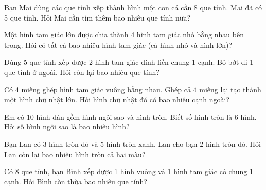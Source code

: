 \begin{ex}
Bạn Mai dùng các que tính xếp thành hình một con cá cần 8 que tính. Mai đã có 5 que tính. Hỏi Mai cần tìm thêm bao nhiêu que tính nữa?
\end{ex}

\begin{ex}
Một hình tam giác lớn được chia thành 4 hình tam giác nhỏ bằng nhau bên trong. Hỏi có tất cả bao nhiêu hình tam giác (cả hình nhỏ và hình lớn)?
\end{ex}

\begin{ex}
Dùng 5 que tính xếp được 2 hình tam giác dính liền chung 1 cạnh. Bỏ bớt đi 1 que tính ở ngoài. Hỏi còn lại bao nhiêu que tính?
\end{ex}

\begin{ex}
Có 4 miếng ghép hình tam giác vuông bằng nhau. Ghép cả 4 miếng lại tạo thành một hình chữ nhật lớn. Hỏi hình chữ nhật đó có bao nhiêu cạnh ngoài?
\end{ex}

\begin{ex}
Em có 10 hình dán gồm hình ngôi sao và hình tròn. Biết số hình tròn là 6 hình. Hỏi số hình ngôi sao là bao nhiêu hình?
\end{ex}

\begin{ex}
Bạn Lan có 3 hình tròn đỏ và 5 hình tròn xanh. Lan cho bạn 2 hình tròn đỏ. Hỏi Lan còn lại bao nhiêu hình tròn cả hai màu?
\end{ex}

\begin{ex}
Có 8 que tính, bạn Bình xếp được 1 hình vuông và 1 hình tam giác có chung 1 cạnh. Hỏi Bình còn thừa bao nhiêu que tính?
\end{ex}

